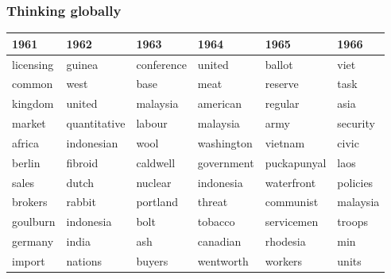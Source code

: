 \documentclass{beamer}       %
\begin{document}
\begin{frame}
\frametitle{Thinking globally}
\begin{table}[h!]
\tiny
\begin{tabular}{llllll}

\toprule
\textbf{1961}            & \textbf{1962}          & \textbf{1963}        & \textbf{1964}       & \textbf{1965}          & \textbf{1966}         \\ \midrule
licensing       & \cellcolor{blue!25}guinea        & conference  & united     & \cellcolor{gray!25}ballot        & \cellcolor{blue!25}viet          \\
common          & west          & base        & \cellcolor{red!25}meat       & \cellcolor{orange!25}reserve       & task          \\
kingdom         & united        & \cellcolor{blue!25}malaysia    & \cellcolor{blue!25}american   & regular       & \cellcolor{blue!25}asia          \\
\cellcolor{orange!25}market          & quantitative  & labour      & \cellcolor{blue!25}malaysia   & \cellcolor{green!25}army          & security      \\
\cellcolor{blue!25}africa          & \cellcolor{blue!25}indonesian    & \cellcolor{red!25}wool        & \cellcolor{blue!25}washington & \cellcolor{blue!25}vietnam       & civic         \\
\cellcolor{blue!25}berlin          & \cellcolor{yellow!25}fibroid       & caldwell    & government & \cellcolor{green!25}puckapunyal   & \cellcolor{blue!25}laos          \\
\cellcolor{orange!25}sales           & dutch         & nuclear     & \cellcolor{blue!25}indonesia  & waterfront    & \cellcolor{gray!25}policies      \\
\cellcolor{orange!25}brokers         & \cellcolor{red!25}rabbit        & portland    & threat     & \cellcolor{blue!25}communist     & \cellcolor{blue!25}malaysia      \\
\cellcolor{yellow!25}goulburn        & \cellcolor{blue!25}indonesia     & bolt        & \cellcolor{red!25}tobacco    & \cellcolor{green!25}servicemen    & \cellcolor{green!25}troops        \\
\cellcolor{blue!25}germany         & \cellcolor{blue!25}india         & ash         & \cellcolor{blue!25}canadian   & \cellcolor{blue!25}rhodesia      & min           \\
import          & nations       & buyers      & wentworth  & \cellcolor{red!25}workers       & \cellcolor{green!25}units         \\

\end{tabular}
\end{table}
\end{frame}
\end{document}

